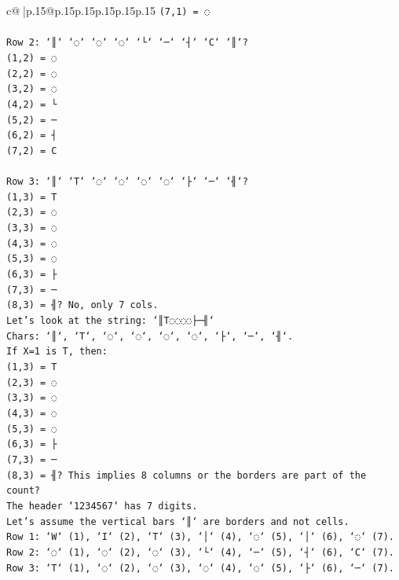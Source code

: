 \documentclass{article}
\begin{document}
{\begin{supertabular}{c@{$\;$}|p{.15\linewidth}@{}p{.15\linewidth}p{.15\linewidth}p{.15\linewidth}p{.15\linewidth}p{.15\linewidth}}
{{{\texttt{(7,1) = ◌} \\
\\ 
\texttt{Row 2: `║` `◌` `◌` `◌` `└` `─` `┤` `C` `║`?} \\
\texttt{(1,2) = ◌} \\
\texttt{(2,2) = ◌} \\
\texttt{(3,2) = ◌} \\
\texttt{(4,2) = └} \\
\texttt{(5,2) = ─} \\
\texttt{(6,2) = ┤} \\
\texttt{(7,2) = C} \\
\\ 
\texttt{Row 3: `║` `T` `◌` `◌` `◌` `◌` `├` `─` `╢`?} \\
\texttt{(1,3) = T} \\
\texttt{(2,3) = ◌} \\
\texttt{(3,3) = ◌} \\
\texttt{(4,3) = ◌} \\
\texttt{(5,3) = ◌} \\
\texttt{(6,3) = ├} \\
\texttt{(7,3) = ─} \\
\texttt{(8,3) = ╢? No, only 7 cols.} \\
\texttt{Let's look at the string: `║T◌◌◌◌├─╢`} \\
\texttt{Chars: `║`, `T`, `◌`, `◌`, `◌`, `◌`, `├`, `─`, `╢`.} \\
\texttt{If X=1 is T, then:} \\
\texttt{(1,3) = T} \\
\texttt{(2,3) = ◌} \\
\texttt{(3,3) = ◌} \\
\texttt{(4,3) = ◌} \\
\texttt{(5,3) = ◌} \\
\texttt{(6,3) = ├} \\
\texttt{(7,3) = ─} \\
\texttt{(8,3) = ╢? This implies 8 columns or the borders are part of the count?} \\
\texttt{The header `1234567` has 7 digits.} \\
\texttt{Let's assume the vertical bars `║` are borders and not cells.} \\
\texttt{Row 1: `W` (1), `I` (2), `T` (3), `│` (4), `◌` (5), `│` (6), `◌` (7).} \\
\texttt{Row 2: `◌` (1), `◌` (2), `◌` (3), `└` (4), `─` (5), `┤` (6), `C` (7).} \\
\texttt{Row 3: `T` (1), `◌` (2), `◌` (3), `◌` (4), `◌` (5), `├` (6), `─` (7).} \\
}}}
\end{supertabular}}
\end{document}
